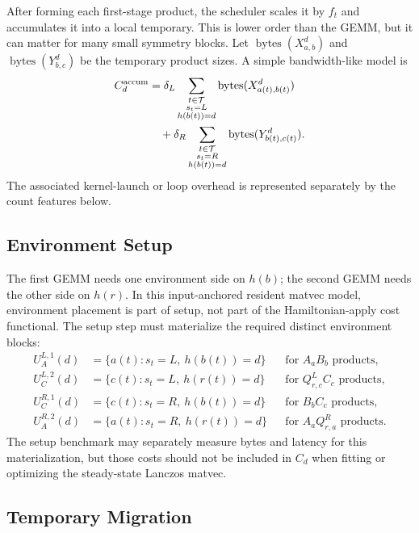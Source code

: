 \documentclass[11pt]{article}
\begin{document}
After forming each first-stage product, the scheduler scales it by $f_t$ and
accumulates it into a local temporary.  This is lower order than the GEMM, but
it can matter for many small symmetry blocks.  Let
$\operatorname{bytes}(X^d_{a,b})$ and $\operatorname{bytes}(Y^d_{b,c})$ be the
temporary product sizes.  A simple bandwidth-like model is
\begin{align}
  C^{\mathrm{accum}}_d &=
    \delta_L
      \sum_{\substack{t\in\mathcal{T}\\s_t=L\\h(b(t))=d}}
        \operatorname{bytes}(X^d_{a(t),b(t)}) \notag\\
  &\quad+
    \delta_R
      \sum_{\substack{t\in\mathcal{T}\\s_t=R\\h(b(t))=d}}
        \operatorname{bytes}(Y^d_{b(t),c(t)}).
\end{align}
The associated kernel-launch or loop overhead is represented separately by the
count features below.

\subsection{Environment Setup}

The first GEMM needs one environment side on $h(b)$; the second GEMM needs the
other side on $h(r)$.  In this input-anchored resident matvec model, environment
placement is part of setup, not part of the Hamiltonian-apply cost functional.
The setup step must materialize the required distinct environment blocks:
\begin{align}
  U^{L,1}_A(d) &= \{a(t): s_t=L,\ h(b(t))=d\}
    &&\text{for } A_aB_b \text{ products},\\
  U^{L,2}_C(d) &= \{c(t): s_t=L,\ h(r(t))=d\}
    &&\text{for } Q^L_{r,c}C_c \text{ products},\\
  U^{R,1}_C(d) &= \{c(t): s_t=R,\ h(b(t))=d\}
    &&\text{for } B_bC_c \text{ products},\\
  U^{R,2}_A(d) &= \{a(t): s_t=R,\ h(r(t))=d\}
    &&\text{for } A_aQ^R_{r,a} \text{ products}.
\end{align}
The setup benchmark may separately measure bytes and latency for this
materialization, but those costs should not be included in $C_d$ when fitting
or optimizing the steady-state Lanczos matvec.

\subsection{Temporary Migration}
\end{document}
